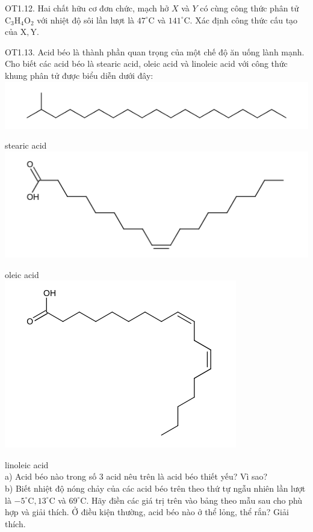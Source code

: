 \documentclass[10pt]{article}
\begin{document}
OT1.12. Hai chất hữu cơ đơn chức, mạch hở $X$ và $Y$ có cùng công thức phân tử $\mathrm{C}_{3} \mathrm{H}_{4} \mathrm{O}_{2}$ với nhiệt độ sôi lần lượt là $47^{\circ} \mathrm{C}$ và $141^{\circ} \mathrm{C}$. Xác định công thức cấu tạo của $\mathrm{X}, \mathrm{Y}$.

OT1.13. Acid béo là thành phần quan trọng của một chế độ ăn uống lành mạnh. Cho biết các acid béo là stearic acid, oleic acid và linoleic acid với công thức khung phân tử được biểu diễn dưới đây:\\
\includegraphics{smile-5d9c0af85b7203517e5ecb36a0446ddb7f1c99ee}

stearic acid\\
\includegraphics{smile-891fa39fff480eba68434015d30981331f44267a}

oleic acid\\
\includegraphics{smile-1a6a5bf79dc94f93de3f3def086c5d6126489e03}

linoleic acid\\
a) Acid béo nào trong số 3 acid nêu trên là acid béo thiết yếu? Vì sao?\\
b) Biết nhiệt độ nóng chảy của các acid béo trên theo thứ tự ngẫu nhiên lần lượt là $-5^{\circ} \mathrm{C}, 13^{\circ} \mathrm{C}$ và $69^{\circ} \mathrm{C}$. Hãy điền các giá trị trên vào bảng theo mẫu sau cho phù hợp và giải thích. Ở điều kiện thường, acid béo nào ở thể lỏng, thể rắn? Giải thích.
\end{document}
